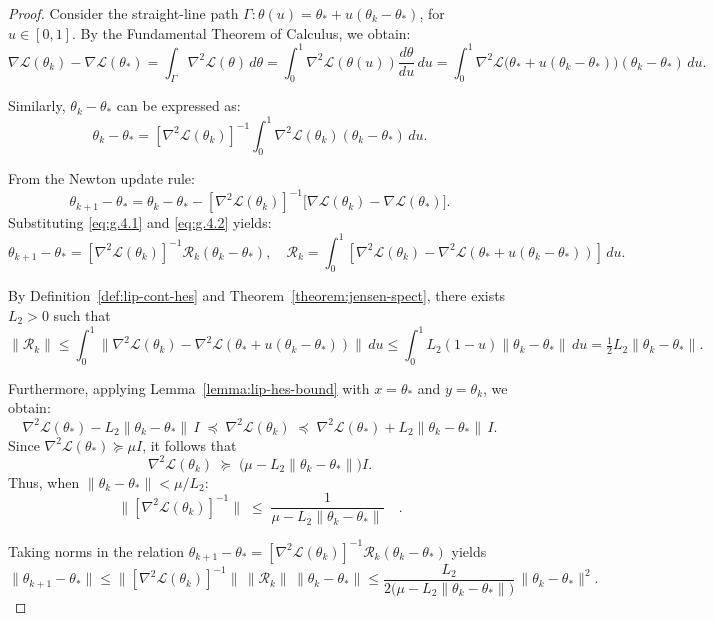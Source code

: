 \documentclass{article}
\theoremstyle{plain}
\theoremstyle{definition}
\theoremstyle{remark}
\begin{document}
\begin{proof}
Consider the straight-line path
$\Gamma : \theta(u) = \theta_* + u(\theta_k - \theta_*)$, for $u \in [0,1]$. By the Fundamental Theorem of Calculus, we obtain:
\begin{equation}\label{eq:g.4.1}
\nabla \mathcal{L}(\theta_k)-\nabla \mathcal{L}(\theta_*) 
= \int_{\Gamma} \nabla^{2} \mathcal{L}(\theta)\, d\theta 
= \int_{0}^{1} \nabla^{2} \mathcal{L}(\theta(u)) \frac{d\theta}{du}\, du
= \int_0^1 \nabla^2 \mathcal{L}\bigl(\theta_*+u(\theta_k-\theta_*)\bigr)(\theta_k-\theta_*)\,du .
\end{equation}

Similarly, $\theta_k - \theta_*$ can be expressed as:
\begin{equation}\label{eq:g.4.2}
\theta_k - \theta_* 
= [\nabla^2 \mathcal{L}(\theta_k)]^{-1}\int_{0}^{1} \nabla^2 \mathcal{L}(\theta_k)(\theta_k-\theta_*)\,du .
\end{equation}

From the Newton update rule:
\[
\theta_{k+1} - \theta_* = \theta_k - \theta_* - [\nabla^2 \mathcal{L}(\theta_k)]^{-1}\bigl[\nabla \mathcal{L}(\theta_k) - \nabla \mathcal{L}(\theta_*)\bigr].
\]
Substituting \eqref{eq:g.4.1} and \eqref{eq:g.4.2} yields:
\[
\theta_{k+1} - \theta_*
= [\nabla^2 \mathcal{L}(\theta_k)]^{-1}\mathcal{R}_k(\theta_k-\theta_*),
\quad
\mathcal{R}_k = \int_{0}^{1} [\nabla^2 \mathcal{L}(\theta_k) - \nabla^{2} \mathcal{L}(\theta_* + u(\theta_k - \theta_*))]\,du.
\]

By Definition~\ref{def:lip-cont-hes} and Theorem~\ref{theorem:jensen-spect}, there exists $L_2>0$ such that
\[
\|\mathcal{R}_k\|
\le \int_0^1 \|\nabla^2 \mathcal{L}(\theta_k) - \nabla^2 \mathcal{L}(\theta_*+u(\theta_k-\theta_*))\|\,du
\le \int_0^1 L_2(1-u)\|\theta_k-\theta_*\|\,du
= \tfrac{1}{2}L_2\|\theta_k-\theta_*\|.
\]

Furthermore, applying Lemma~\ref{lemma:lip-hes-bound} with $x=\theta_*$ and $y=\theta_k$, we obtain:
\[
\nabla^{2} \mathcal{L}(\theta_*) - L_2\|\theta_k-\theta_*\|\,I 
\;\preceq\; \nabla^{2} \mathcal{L}(\theta_k) 
\;\preceq\; \nabla^{2} \mathcal{L}(\theta_*) + L_2\|\theta_k-\theta_*\|\,I.
\]
Since $\nabla^{2} \mathcal{L}(\theta_*) \succeq \mu I$, it follows that
\[
\nabla^{2} \mathcal{L}(\theta_k) \;\succeq\; \bigl(\mu - L_2\|\theta_k-\theta_*\|\bigr)I.
\]
Thus, when $\|\theta_k-\theta_*\|<\mu/L_2$:
\[
\bigl\|[\nabla^{2} \mathcal{L}(\theta_k)]^{-1}\bigr\| 
\;\le\; \frac{1}{\mu - L_2\|\theta_k-\theta_*\|} 
\quad.
\]

Taking norms in the relation $\theta_{k+1}-\theta_*=[\nabla^2 \mathcal{L}(\theta_k)]^{-1}\mathcal{R}_k(\theta_k-\theta_*)$ yields
\[
\|\theta_{k+1}-\theta_*\|
\le \bigl\|[\nabla^2 \mathcal{L}(\theta_k)]^{-1}\bigr\|\,\|\mathcal{R}_k\|\,\|\theta_k-\theta_*\|
\le \frac{L_2}{2\bigl(\mu - L_2\|\theta_k-\theta_*\|\bigr)}\,\|\theta_k-\theta_*\|^2.
\]


\end{proof}
\end{document}
